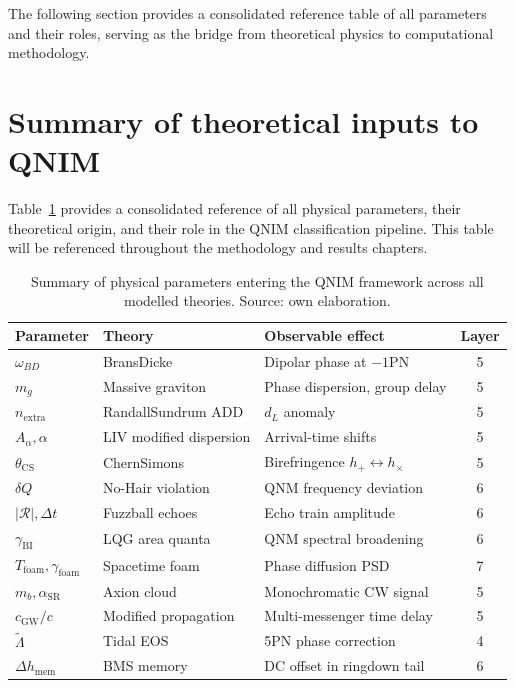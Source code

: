\documentclass[11pt,a4paper, english]{book}
\theoremstyle{plain}
\theoremstyle{definition}
\numberwithin{equation}{chapter}
\numberwithin{figure}{chapter}
\numberwithin{table}{chapter}
\begin{document}
The following section provides a consolidated reference table of all parameters and their roles, serving as the bridge from theoretical physics to computational methodology.

\section{Summary of theoretical inputs to QNIM}
\label{sec:theory-summary}

Table~\ref{tab:theory-summary} provides a consolidated reference of all
physical parameters, their theoretical origin, and their role in the QNIM
classification pipeline.  This table will be referenced throughout the
methodology and results chapters.

\begin{table}[H]
\centering
\small
\begin{tabular}{@{}lllc@{}}
\toprule
\textbf{Parameter} & \textbf{Theory} & \textbf{Observable effect} &
\textbf{Layer} \\
\midrule
$\omega_{BD}$ & BransDicke & Dipolar phase at $-1$PN & 5 \\
$m_g$         & Massive graviton & Phase dispersion, group delay & 5 \\
$n_\mathrm{extra}$ & RandallSundrum ADD & $d_L$ anomaly & 5 \\
$A_\alpha, \alpha$ & LIV modified dispersion & Arrival-time shifts & 5 \\
$\theta_\mathrm{CS}$ & ChernSimons & Birefringence $h_+ \leftrightarrow h_\times$ & 5 \\
$\delta Q$ & No-Hair violation & QNM frequency deviation & 6 \\
$|\mathcal{R}|, \Delta t$ & Fuzzball echoes & Echo train amplitude & 6 \\
$\gamma_\mathrm{BI}$ & LQG area quanta & QNM spectral broadening & 6 \\
$T_\mathrm{foam}, \gamma_\mathrm{foam}$ & Spacetime foam & Phase diffusion PSD & 7 \\
$m_b, \alpha_\mathrm{SR}$ & Axion cloud & Monochromatic CW signal & 5 \\
$c_\mathrm{GW}/c$ & Modified propagation & Multi-messenger time delay & 5 \\
$\tilde{\Lambda}$ & Tidal EOS & 5PN phase correction & 4 \\
$\Delta h_\mathrm{mem}$ & BMS memory & DC offset in ringdown tail & 6 \\
\bottomrule
\end{tabular}
\caption[Summary of physical parameters in QNIM]{Summary of physical parameters entering the QNIM framework across
         all modelled theories. Source: own elaboration.}
\label{tab:theory-summary}
\vspace{2pt}
\footnotesize
\normalsize

\end{table}
\end{document}
